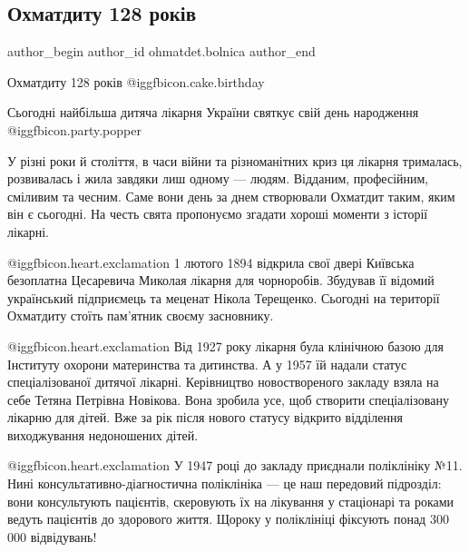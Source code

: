  
 
 
 
 
 
\subsection{Охматдиту 128 років}
\label{sec:01_02_2022.fb.ohmatdet.bolnica.1.128_let}
 
\ifcmt
 author_begin
   author_id ohmatdet.bolnica
 author_end
\fi

Охматдиту 128 років @igg{fbicon.cake.birthday} 

Сьогодні найбільша дитяча лікарня України святкує свій день народження  @igg{fbicon.party.popper} 


У різні роки й століття, в часи війни та різноманітних криз ця лікарня
трималась, розвивалась і жила завдяки лиш одному — людям. Відданим,
професійним, сміливим та чесним. Саме вони день за днем створювали Охматдит
таким, яким він є сьогодні. На честь свята пропонуємо згадати хороші моменти з
історії лікарні.

@igg{fbicon.heart.exclamation} 1 лютого 1894 відкрила свої двері Київська
безоплатна Цесаревича Миколая лікарня для чорноробів. Збудував її відомий
український підприємець та меценат Нікола Терещенко. Сьогодні на території
Охматдиту стоїть пам’ятник своєму засновнику.

@igg{fbicon.heart.exclamation} Від 1927 року лікарня була клінічною базою для
Інституту охорони материнства та дитинства. А у 1957 їй надали статус
спеціалізованої дитячої лікарні.  Керівництво новоствореного закладу взяла на
себе Тетяна Петрівна Новікова. Вона зробила усе, щоб створити спеціалізовану
лікарню для дітей. Вже за рік після нового статусу відкрито відділення
виходжування недоношених дітей.

@igg{fbicon.heart.exclamation} У 1947 році до закладу приєднали поліклініку №11. Нині
консультативно-діагностична поліклініка — це наш передовий підрозділ: вони
консультують пацієнтів, скеровують їх на лікування у стаціонарі та роками
ведуть пацієнтів до здорового життя. Щороку у поліклініці фіксують понад 300
000 відвідувань!

